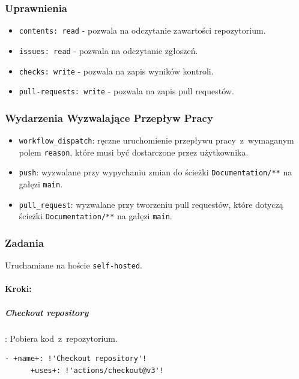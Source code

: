 \subsubsection{Uprawnienia}
\begin{itemize}
    \item \texttt{\textcolor{codeblue}{contents: read}} - pozwala na odczytanie zawartości repozytorium.
    \item \texttt{\textcolor{codeblue}{issues: read}} - pozwala na odczytanie zgłoszeń.
    \item \texttt{\textcolor{codeblue}{checks: write}} - pozwala na zapis wyników kontroli.
    \item \texttt{\textcolor{codeblue}{pull-requests: write}} - pozwala na zapis pull requestów.
\end{itemize}

\subsubsection{Wydarzenia Wyzwalające Przepływ Pracy}
\begin{itemize}
    \item \texttt{\textcolor{codeblue}{workflow\_dispatch}}: ręczne uruchomienie przepływu pracy~z~wymaganym polem \texttt{\textcolor{codeblue}{reason}}, które musi być dostarczone przez użytkownika.
    \item \texttt{\textcolor{codeblue}{push}}: wyzwalane przy wypychaniu zmian do ścieżki \texttt{\textcolor{codeblue}{Documentation/**}} na gałęzi \texttt{\textcolor{codeblue}{main}}.
    \item \texttt{\textcolor{codeblue}{pull\_request}}: wyzwalane przy tworzeniu pull requestów, które dotyczą ścieżki \texttt{\textcolor{codeblue}{Documentation/**}} na gałęzi \texttt{\textcolor{codeblue}{main}}.
\end{itemize}

\subsubsection{Zadania}
Uruchamiane na hoście \texttt{\textcolor{codeblue}{self-hosted}}.
\paragraph{Kroki:}
\subparagraph{Checkout repository}: Pobiera kod~z~repozytorium.
\begin{lstlisting}[style=yaml-colored]
    - +name+: !'Checkout repository'!
      +uses+: !'actions/checkout@v3'!
\end{lstlisting}


